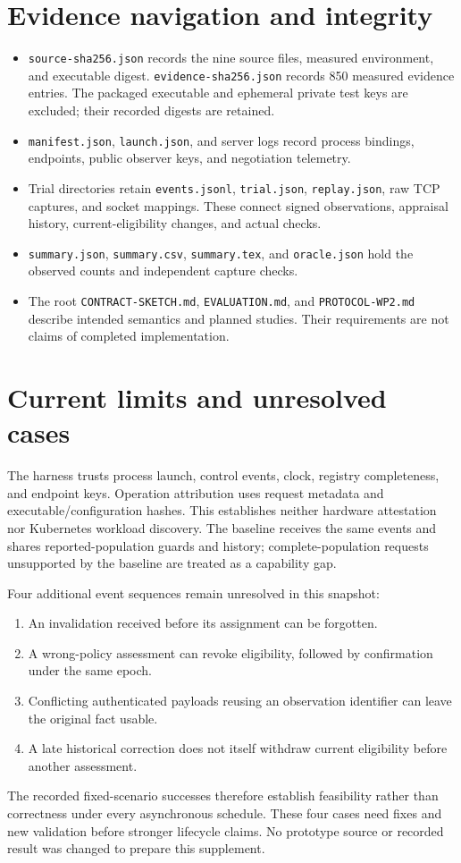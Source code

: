 \documentclass[10pt,a4paper]{article}
\begin{document}
\section{Evidence navigation and integrity}
\begin{itemize}
\item \texttt{source-sha256.json} records the nine source files, measured environment, and executable digest. \texttt{evidence-sha256.json} records 850 measured evidence entries. The packaged executable and ephemeral private test keys are excluded; their recorded digests are retained.
\item \texttt{manifest.json}, \texttt{launch.json}, and server logs record process bindings, endpoints, public observer keys, and negotiation telemetry.
\item Trial directories retain \texttt{events.jsonl}, \texttt{trial.json}, \texttt{replay.json}, raw TCP captures, and socket mappings. These connect signed observations, appraisal history, current-eligibility changes, and actual checks.
\item \texttt{summary.json}, \texttt{summary.csv}, \texttt{summary.tex}, and \texttt{oracle.json} hold the observed counts and independent capture checks.
\item The root \texttt{CONTRACT-SKETCH.md}, \texttt{EVALUATION.md}, and \texttt{PROTOCOL-WP2.md} describe intended semantics and planned studies. Their requirements are not claims of completed implementation.
\end{itemize}

\section{Current limits and unresolved cases}
The harness trusts process launch, control events, clock, registry completeness, and endpoint keys. Operation attribution uses request metadata and executable/configuration hashes. This establishes neither hardware attestation nor Kubernetes workload discovery. The baseline receives the same events and shares reported-population guards and history; complete-population requests unsupported by the baseline are treated as a capability gap.

Four additional event sequences remain unresolved in this snapshot:
\begin{enumerate}
\item An invalidation received before its assignment can be forgotten.
\item A wrong-policy assessment can revoke eligibility, followed by confirmation under the same epoch.
\item Conflicting authenticated payloads reusing an observation identifier can leave the original fact usable.
\item A late historical correction does not itself withdraw current eligibility before another assessment.
\end{enumerate}
The recorded fixed-scenario successes therefore establish feasibility rather than correctness under every asynchronous schedule. These four cases need fixes and new validation before stronger lifecycle claims. No prototype source or recorded result was changed to prepare this supplement.
\end{document}
